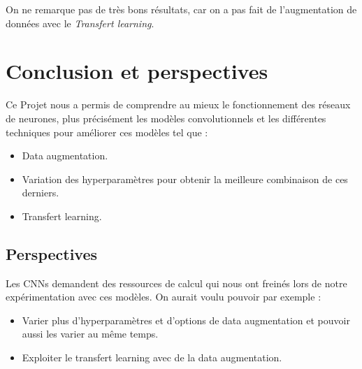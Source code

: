 \documentclass[12pt,titlepage]{article}
\begin{document}
On ne remarque pas de très bons résultats, car on a pas fait de l'augmentation de données avec le \textit{Transfert learning}.

\newpage

\section{Conclusion et perspectives}
Ce Projet nous a permis de comprendre au mieux le fonctionnement des réseaux de neurones, plus précisément les modèles convolutionnels et les différentes techniques pour améliorer ces modèles tel que :
\begin{itemize}
\item Data augmentation.
\item Variation des hyperparamètres pour obtenir la meilleure combinaison de ces derniers.
\item Transfert learning.
\end{itemize}

\subsection{Perspectives}

Les CNNs demandent des ressources de calcul qui nous ont freinés lors de notre expérimentation avec ces modèles. On aurait voulu pouvoir par exemple :
\begin{itemize}
\item Varier plus d'hyperparamètres et d'options de data augmentation et pouvoir aussi les varier au même temps.
\item Exploiter le transfert learning avec de la data augmentation.
\end{itemize}
\end{document}
